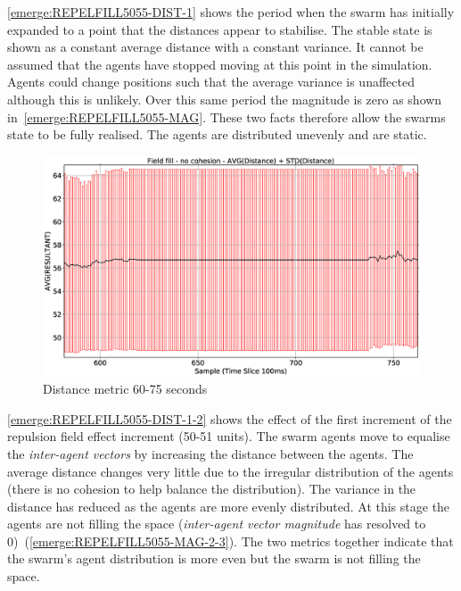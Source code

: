 \autoref{emerge:REPELFILL5055-DIST-1} shows the period when the swarm has initially expanded to a point that the distances appear to stabilise. The stable state is shown as a constant average distance with a constant variance. It cannot be assumed that the agents have stopped moving at this point in the simulation. Agents could change positions such that the average variance is unaffected although this is unlikely. Over this same period the magnitude is zero as shown in~\autoref{emerge:REPELFILL5055-MAG}. These two facts therefore allow the swarms state to be fully realised. The agents are distributed unevenly and are static.

\begin{figure}[H]
\begin{center}
\includegraphics[width=12cm]{CHAPTER-8/figures/REPELFILL5055-DIST-1}
\end{center}
\caption{Distance metric 60-75 seconds\label{emerge:REPELFILL5055-DIST-1}}
\end{figure}

\autoref{emerge:REPELFILL5055-DIST-1-2} shows the effect of the first increment of the repulsion field effect increment (50-51 units). The swarm agents move to equalise the \textit{inter-agent vectors} by increasing the distance between the agents. The average distance changes very little due to the irregular distribution of the agents (there is no cohesion to help balance the distribution). The variance in the distance has reduced as the agents are more evenly distributed. At this stage the agents are not filling the space (\textit{inter-agent vector magnitude} has resolved to 0)~(\autoref{emerge:REPELFILL5055-MAG-2-3}). The two metrics together indicate that the swarm's agent distribution is more even but the swarm is not filling the space.


